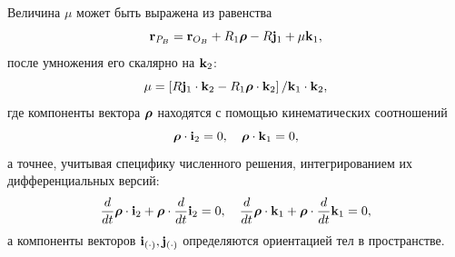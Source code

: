 Величина $\mu$ может быть выражена из равенства
$$
{\bf r}_{P_B}={\bf r}_{O_B}+R_1\boldsymbol{\mathbf{\rho}} -R{\bf j}_1+\mu {\bf k}_1,
$$
после умножения его скалярно на ${\bf k}_2$:
$$
\mu =\left[R{\bf j}_1\cdot{\bf k}_2-R_1{\boldsymbol{\mathbf{\rho}} }\cdot {\bf k}_2\right] /
{\bf k}_1\cdot{\bf k}_2,
$$
где компоненты вектора $\boldsymbol{\mathbf{\rho}}$ находятся с помощью кинематических соотношений
$$
\boldsymbol{\mathbf{\rho}}\cdot {\bf i}_2=0,\quad\boldsymbol{\mathbf{\rho}}\cdot {\bf k}_1=0,
$$
а точнее, учитывая специфику численного решения, интегрированием их дифференциальных версий:
$$
\dfrac{d}{dt}\boldsymbol{\mathbf{\rho}}\cdot {\bf i}_2+\boldsymbol{\mathbf{\rho}}\cdot\dfrac{d}{dt}{\bf i}_2=0,\quad
\dfrac{d}{dt}\boldsymbol{\mathbf{\rho}}\cdot {\bf k}_1+\boldsymbol{\mathbf{\rho}}\cdot\dfrac{d}{dt}{\bf k}_1=0,
$$
а компоненты векторов ${\bf i}_{(\cdot)},{\bf j}_{(\cdot)}$ определяются ориентацией тел в пространстве.

%
%
%
%
%
%
%
%

